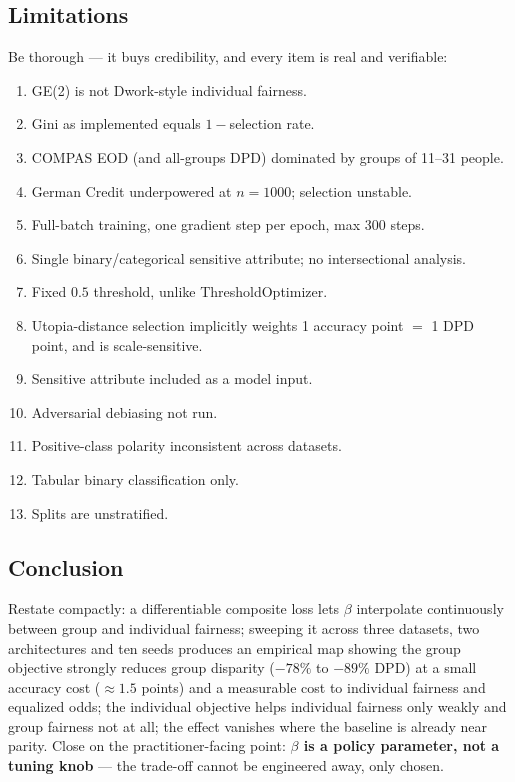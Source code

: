 \subsection{Limitations}
Be thorough --- it buys credibility, and every item is real and verifiable:
\begin{enumerate}[itemsep=1pt]
\item GE(2) is not Dwork-style individual fairness.
\item Gini as implemented equals $1-$selection rate.
\item COMPAS EOD (and all-groups DPD) dominated by groups of 11--31 people.
\item German Credit underpowered at $n=1000$; selection unstable.
\item Full-batch training, one gradient step per epoch, max 300 steps.
\item Single binary/categorical sensitive attribute; no intersectional analysis.
\item Fixed $0.5$ threshold, unlike ThresholdOptimizer.
\item Utopia-distance selection implicitly weights 1 accuracy point $=$ 1 DPD
point, and is scale-sensitive.
\item Sensitive attribute included as a model input.
\item Adversarial debiasing not run.
\item Positive-class polarity inconsistent across datasets.
\item Tabular binary classification only.
\item Splits are unstratified.
\end{enumerate}

\subsection{Conclusion}
Restate compactly: a differentiable composite loss lets $\beta$ interpolate
continuously between group and individual fairness; sweeping it across three
datasets, two architectures and ten seeds produces an empirical map showing the
group objective strongly reduces group disparity ($-78\%$ to $-89\%$ DPD) at a
small accuracy cost ($\approx1.5$ points) and a measurable cost to individual
fairness and equalized odds; the individual objective helps individual fairness
only weakly and group fairness not at all; the effect vanishes where the
baseline is already near parity. Close on the practitioner-facing point:
\textbf{$\beta$ is a policy parameter, not a tuning knob} --- the trade-off
cannot be engineered away, only chosen.

